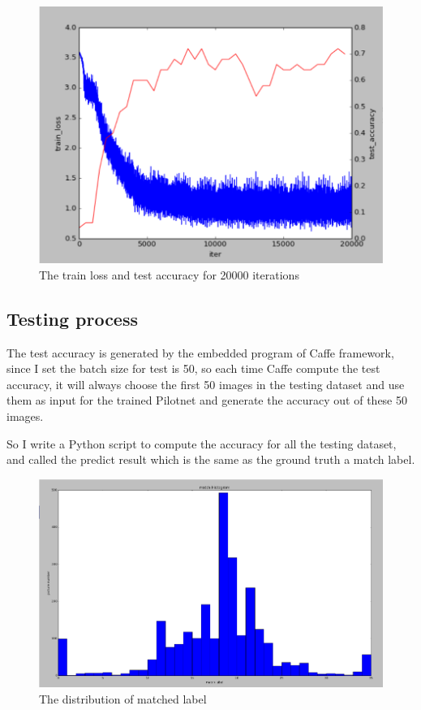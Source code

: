 \documentclass[conference]{IEEEtran}
\begin{document}
\begin{figure}[h]
	\begin{center}
		
		\includegraphics[width=0.8\linewidth]{fig5.png}
	\end{center}
	\caption{The train loss and test accuracy for 20000 iterations}
	\label{fig:long5}
\end{figure}




\subsection{Testing process}
The test accuracy is generated by the embedded program of Caffe framework, since I set the batch size for test is 50, so each time Caffe compute the test accuracy, it will always choose the first 50 images in the testing dataset and use them as input for the trained Pilotnet and generate the accuracy out of these 50 images.\par  

So I write a Python script to compute the accuracy for all the testing dataset, and called the predict result which is the same as the ground truth a match label.\par

\begin{figure}[h]
	\begin{center}
		
		\includegraphics[width=0.8\linewidth]{fig7.png}
	\end{center}
	\caption{The distribution of matched label}
	\label{fig:long7}
\end{figure}
\end{document}
